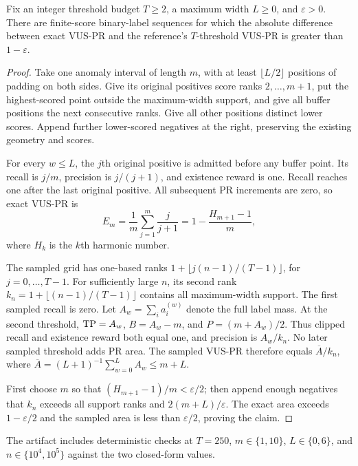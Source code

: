 \begin{proposition}
Fix an integer threshold budget $T\ge2$, a maximum width $L\ge0$, and
$\varepsilon>0$. There are finite-score binary-label sequences for which the
absolute difference between exact VUS-PR and the reference's $T$-threshold
VUS-PR is greater than $1-\varepsilon$.
\end{proposition}
\begin{proof}
Take one anomaly interval of length $m$, with at least $\lfloor L/2\rfloor$
positions of padding on both sides. Give its original positives score ranks
$2,\allowbreak \ldots,\allowbreak m+1$, put the highest-scored point outside the maximum-width
support, and give all buffer positions the next consecutive ranks. Give all
other positions distinct lower scores. Append further lower-scored negatives
at the right, preserving the existing geometry and scores.

For every $w\le L$, the $j$th original positive is admitted before any buffer
point. Its recall is $j/m$, precision is $j/(j+1)$, and existence reward is
one. Recall reaches one after the last original positive. All subsequent PR
increments are zero, so exact VUS-PR is
\begin{equation}
 E_m=\frac1m\sum_{j=1}^m\frac{j}{j+1}
 =1-\frac{H_{m+1}-1}{m},
\end{equation}
where $H_k$ is the $k$th harmonic number.

The sampled grid has one-based ranks
$1+\lfloor j(n-1)/(T-1)\rfloor$, for $j=0,\allowbreak \ldots,\allowbreak T-1$.
For sufficiently large $n$, its second rank
$k_n=1+\lfloor(n-1)/(T-1)\rfloor$ contains all maximum-width support.
The first sampled recall is zero. Let $A_w=\sum_i a_i^{(w)}$ denote the full
label mass. At the second threshold, $\mathrm{TP}=A_w$, $B=A_w-m$, and
$P=(m+A_w)/2$. Thus clipped recall and existence reward both equal one,
and precision is $A_w/k_n$. No later sampled threshold adds PR area.
The sampled VUS-PR therefore equals
$\overline A/k_n$, where $\overline A=(L+1)^{-1}\sum_{w=0}^L A_w\le m+L$.

First choose $m$ so that $(H_{m+1}-1)/m<\varepsilon/2$; then append enough
negatives that $k_n$ exceeds all support ranks and
$2(m+L)/\varepsilon$. The exact area exceeds $1-\varepsilon/2$ and the
sampled area is less than $\varepsilon/2$, proving the claim.
\end{proof}
The artifact includes deterministic checks at $T=250$, $m\in\{1,\allowbreak 10\}$,
$L\in\{0,\allowbreak 6\}$, and $n\in\{10^4,\allowbreak 10^5\}$ against the two closed-form values.


